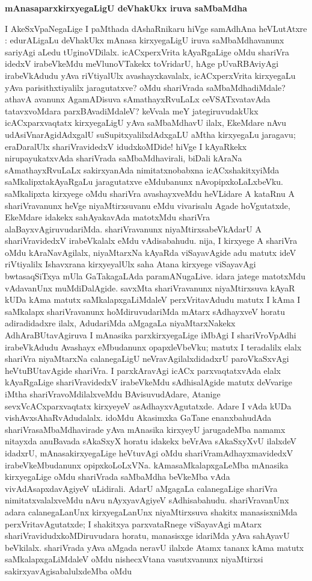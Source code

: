 \smallskip
\begin{center}
{\Large\bf mAnasaparxkirxyegaLigU deVhakUkx iruva saMbaMdha}
\end{center}

I AkeSxVpaNegaLige I paMthada dAshaRnikaru hiVge samAdhAna heVLutAtxre : edurALi\-gaLu deVhakUkx mAnasa kirxyegaLigU iruva saMbaMdhavanunx sariyAgi aLedu tUginoVDilalx. icACxperxVrita kAyaRgaLige oMdu shariVra idedxV irabeVkeMdu meVlu\-noVTakekx toVridarU, hAge pUvaRBAviyAgi irabeVkAdudu yAva riVtiyalUlx avashayxkavalalx, icACxperxVrita kirxyegaLu yAva parisithxtiyalilx jaragutatxve? oMdu shariVrada saMbaMdhadiMdale? athavA avanunx AgamADisuva sAmathayxRvuLaLx ceVSATxvatavAda tatavxvoMdara parxBAvadiMdaleV? keVvala meY jategiruvudakUkx icACxparxvaqtatx kirxyegaLigU yAva saMbaMdhavU ilalx, EkeMdare nAvu udAsiVnarAgidAdxgalU suSupitxyalilx\-dAdxgaLU aMtha kirxyegaLu jaragavu; eraDaralUlx shariVravidedxV idudxkoMDide! hiVge I kAyaRkekx nirupayukatxvAda shariVrada saMbaMdhavirali, biDali kAraNa sAmathayxRvuLaLx sakirxyanAda nimitatxnobabxna icACxshakitxyiMda saMkalipxtakAyaRgaLu jaragutatxve eMdubanunx nAvopipxkoLaLxbeVku. saMkalipxta kirxyege oMdu shariVra avashayxveMdu heVLidare A kataRnu A shariVravanunx heVge niyaMtirxsuvanu eMdu vivarisalu Agade hoVgutatxde, EkeMdare idakekx sahAyakavAda matotxMdu shariVra alaBayxvAgiruvudariMda. shariVravanunx niyaMtirxsabeVkAdarU A shariVravidedxV irabeVkalalx eMdu vAdisabahudu. nija, I kirxyege A shariVra oMdu kAraNavAgilalx, niyaMtarxNa kAyaRda viSayavAgide adu matutx ideV riVtiyalilx Ishavxrana kirxyeyalUlx saha Atana kirxyege viSayavAgi bwtasaqSiTxya mUla GaTakagaLAda paramANugaLive. idara jatege matotxMdu vAdavanUnx muMdiDalAgide. savxMta shariVravanunx niyaMtirxsuva kAyaR kUDa kAma matutx saMkalapxgaLiMdaleV perxVritavAdudu matutx I kAma I saMkalapx shariVravanunx hoMdiruvudariMda mAtarx sAdhayxveV horatu adiradidadxre ilalx, AdudariMda aMgagaLa niyaMtarxNakekx AdhAraBUtavAgiruva I mAnasika parxkirxyegaLige iMbAgi I shariVroVpAdhi irabeVkAdudu Avashayx eMbudanunx opapxleVbeVku; matutx I teradalilx elalx shariVra niyaMtarxNa calanegaLigU neVravAgilalxdidadxrU paroVkaSxvAgi heVtuBUtavAgide shariVra. I parxkAravAgi icACx parxvaqtatxvAda elalx kAyaRgaLige shariVravidedxV irabeVkeMdu sAdhisalAgide matutx deVvarige iMtha shariVravoMdilalxveMdu BAvisuvudAdare, Atanige sevxVcACxparxvaqtatx kirxyeyeV asAdhayxvAgutatxde. Adare I vAda kUDa vishAvxsAhaRvAdudalalx. idoMdu Akasimxka GaTane enanxbahudAda shariVrasaMbaMdhavirade yAva mAnasika kirxyeyU jarugadeMba namamx nitayxda anuBavada sAkaSxyX horatu idakekx beVrAva sAkaSxyXvU ilalxdeV idadxrU, mAnasakirxyegaLige heVtuvAgi oMdu shariVramAdhayxmavidedxV  irabeVkeMbudanunx opipxkoLoLxVNa. kAmasaMkalapxgaLeMba mAnasika kirxyegaLige oMdu shariVrada saMbaMdha beVkeMba vAda vivAdAsapxdavAgiyeV uLidirali. AdarU aMgagaLa calanegaLige shariVra nimitatxvalalxveMdu nAvu nAyxyavAgiyeV sAdhisabahudu. shariVravanUnx adara calanegaLanUnx kirxyegaLanUnx niyaMtirxsuva shakitx manasisxniMda perxVritavAgutatxde; I shakitxya parxvataRnege viSayavAgi mAtarx shariVravidudxkoMDiruvudara horatu, manasisxge idariMda yAva sahAyavU beVkilalx. shariVrada yAva aMgada neravU ilalxde Atamx tananx kAma matutx saMkalapxgaLiMdaleV oMdu nishecxVtana vasutxvanunx niyaMtirxsi sakirxyavAgisabalulxdeMba oMdu 